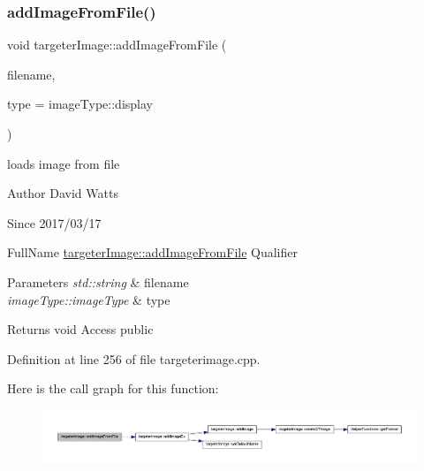 \subsubsection{\texorpdfstring{add\+Image\+From\+File()}{addImageFromFile()}}
{\footnotesize\ttfamily void targeter\+Image\+::add\+Image\+From\+File (\begin{DoxyParamCaption}\item[{std\+::string}]{filename,  }\item[{image\+Type\+::image\+Type}]{type = {\ttfamily imageType\+:\+:display} }\end{DoxyParamCaption})}

loads image from file

\begin{DoxyAuthor}{Author}
David Watts 
\end{DoxyAuthor}
\begin{DoxySince}{Since}
2017/03/17
\end{DoxySince}
Full\+Name \hyperlink{classtargeter_image_a3ebd45ebb6d80dbb175906efbfd5e479}{targeter\+Image\+::add\+Image\+From\+File} Qualifier 
\begin{DoxyParams}{Parameters}
{\em std\+::string} & filename \\
\hline
{\em image\+Type\+::image\+Type} & type \\
\hline
\end{DoxyParams}
\begin{DoxyReturn}{Returns}
void Access public 
\end{DoxyReturn}


Definition at line 256 of file targeterimage.\+cpp.

Here is the call graph for this function\+:
\nopagebreak
\begin{figure}[H]
\begin{center}
\leavevmode
\includegraphics[width=350pt]{classtargeter_image_a3ebd45ebb6d80dbb175906efbfd5e479_cgraph}
\end{center}
\end{figure}
\mbox{\label{classtargeter_image_affcf9e83dc25eb200a8919518cf40155}} 
